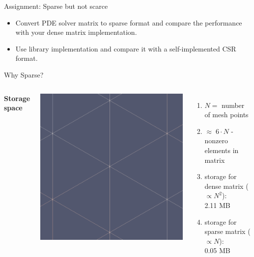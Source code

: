 \documentclass[aspectratio=169,xcolor=dvipsnames]{beamer}
\begin{document}
\begin{frame}{Assignment: Sparse but not scarce}
	\begin{itemize}
	    \item Convert PDE solver matrix to sparse format and compare the performance with your
	dense matrix implementation.
		\item Use library implementation and compare it with a self-implemented CSR format.

	\end{itemize}
\end{frame}

\begin{frame}{Why Sparse?}
    \begin{columns}[c] %

        
        \textbf{Storage space}
        \begin{center}
    \includegraphics[width=0.3\linewidth]{mesh.png}
    \end{center}
        \begin{enumerate}
        	\item $N=$ number of mesh points
            \item $\approx \; 6 \cdot N $ -nonzero elements in matrix
            \item storage for dense matrix ($\propto N^2$): \\ 2.11 MB
            \item storage for sparse matrix ($\propto N$): \\ 0.05 MB
        \end{enumerate}


\end{columns}
\end{frame}
\end{document}
